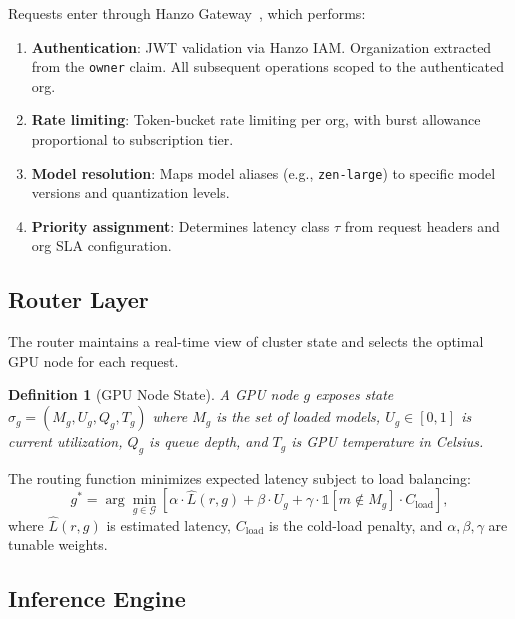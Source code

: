 \documentclass[11pt]{article}
\newtheorem{definition}{Definition}
\begin{document}
Requests enter through Hanzo Gateway~\cite{hanzogateway}, which performs:
\begin{enumerate}[leftmargin=1.4em]
    \item \textbf{Authentication}: JWT validation via Hanzo IAM. Organization
    extracted from the \texttt{owner} claim. All subsequent operations scoped
    to the authenticated org.
    \item \textbf{Rate limiting}: Token-bucket rate limiting per org, with burst
    allowance proportional to subscription tier.
    \item \textbf{Model resolution}: Maps model aliases (e.g.,
    \texttt{zen-large}) to specific model versions and quantization levels.
    \item \textbf{Priority assignment}: Determines latency class $\tau$ from
    request headers and org SLA configuration.
\end{enumerate}

\subsection{Router Layer}

The router maintains a real-time view of cluster state and selects the optimal
GPU node for each request.

\begin{definition}[GPU Node State]
A GPU node $g$ exposes state $\sigma_g = (M_g, U_g, Q_g, T_g)$ where $M_g$ is
the set of loaded models, $U_g \in [0,1]$ is current utilization, $Q_g$ is
queue depth, and $T_g$ is GPU temperature in Celsius.
\end{definition}

The routing function minimizes expected latency subject to load balancing:
\begin{equation}
g^* = \arg\min_{g \in \mathcal{G}} \left[ \alpha \cdot \hat{L}(r, g) +
\beta \cdot U_g + \gamma \cdot \mathbb{1}[m \notin M_g] \cdot C_{\text{load}} \right],
\label{eq:routing}
\end{equation}
where $\hat{L}(r, g)$ is estimated latency, $C_{\text{load}}$ is the cold-load
penalty, and $\alpha, \beta, \gamma$ are tunable weights.

\subsection{Inference Engine}
\end{document}
